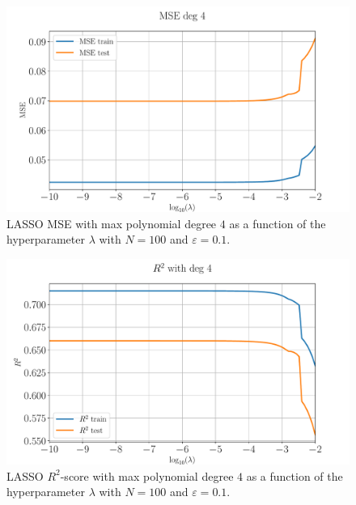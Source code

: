 \documentclass[%
reprint,
amsmath,amssymb,
aps,
pra,
]{revtex4-2}
\begin{document}
\begin{figure}[ht!]
	\centering
	\includegraphics[width=\linewidth]{Python/Figures/LASSO/LASSO_logMSE_no_scaling.pdf}
	\caption{LASSO MSE with max polynomial degree $4$ as a function of the hyperparameter $\lambda$ with $N=100$ and $\varepsilon=0.1$.}
	\label{fig:LASSO_logMSE_degree}
\end{figure}
\begin{figure}[ht!]
	\centering
	\includegraphics[width=\linewidth]{Python/Figures/LASSO/LASSO_logR2_no_scaling.pdf}
	\caption{LASSO $R^2$-score with max polynomial degree $4$ as a function of the hyperparameter $\lambda$ with $N=100$ and $\varepsilon=0.1$.}
	\label{fig:LASSO_logR2_degree}
\end{figure}
\end{document}
